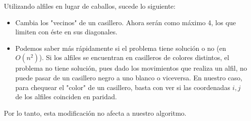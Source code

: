 Utilizando alfiles en lugar de caballos, sucede lo siguiente: 

\begin{itemize}
        \item Cambia los "vecinos" de un casillero. Ahora serán como máximo 4, 
        los que limiten con éste en sus diagonales.

        \item Podemos saber más rápidamente si el problema tiene solución o no (en $O(n^{2})$).
        Si los alfiles se encuentran en casilleros de colores distintos, el problema no tiene 
        solución, pues dado los movimientos que realiza un alfil, no puede pasar de un casillero 
        negro a uno blanco o viceversa. En nuestro caso, para chequear el "color" de un casillero, 
        basta con ver si las coordenadas $i, j$ de los alfiles coinciden en paridad.
\end{itemize}

Por lo tanto, esta modificación no afecta a nuestro algoritmo.
